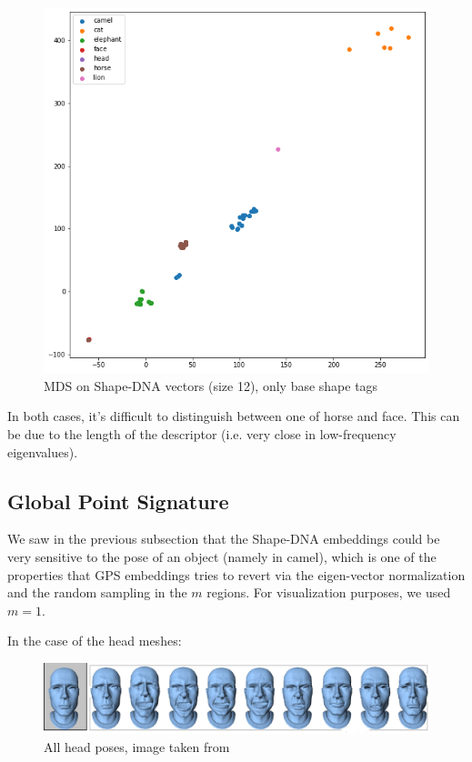 \documentclass[conference]{IEEEtran}
\begin{document}
\begin{figure}[H]
    \centering
    \includegraphics[width=0.9\columnwidth]{mds_simple.png}
    \caption{MDS on Shape-DNA vectors (size 12), only base shape tags}
    \label{fig:mds_simple}
\end{figure}

In both cases, it's difficult to distinguish between one of \textsf{horse} and \textsf{face}. This can be due to the length of the descriptor (i.e. very close in low-frequency eigenvalues).

\subsection{Global Point Signature}

We saw in the previous subsection that the Shape-DNA embeddings could be very sensitive to the pose of an object (namely in \textsf{camel}), which is one of the properties that GPS embeddings tries to revert via the eigen-vector normalization and the random sampling in the $m$ regions. For visualization purposes, we used $m=1$.

In the case of the \textsf{head} meshes:

\begin{figure}[H]
    \centering
    \includegraphics[width=\columnwidth]{head_all.png}
    \caption{All \textsf{head} poses, image taken from \cite{Sumner04}}
    \label{fig:head_all}
\end{figure}
\end{document}
